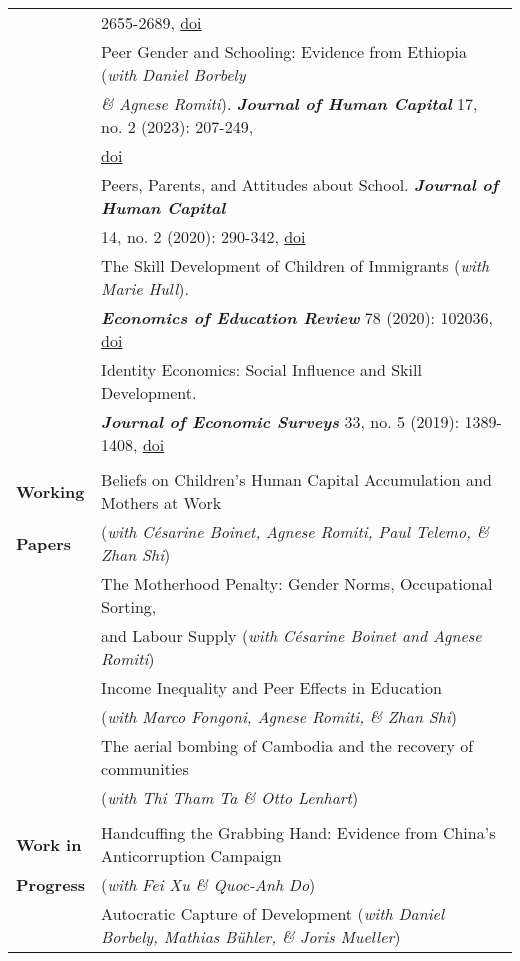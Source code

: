 \documentclass[11pt,a4paper]{article}
\begin{document}
\begin{longtable}{l l}
																				& 2655-2689, \href{https://doi.org/10.1007/s00148-023-00950-4}{doi}  \\
\addlinespace
																				&  Peer Gender and Schooling: Evidence from Ethiopia (\textit{with Daniel Borbely}    \\ 
																				&  \textit{\& Agnese Romiti}). \textbf{\textit{Journal of Human Capital}} 17, no. 2 (2023): 207-249, \\
																				& \href{https://doi.org/10.1086/723111}{doi}     \\ 
\addlinespace
																				&  Peers, Parents, and Attitudes about School. \textbf{\textit{Journal of Human Capital}}  \\
																				&  14, no. 2 (2020): 290-342, \href{https://doi.org/10.1086/709507}{doi}  \\   
\addlinespace						
																				&  The Skill Development of Children of Immigrants (\textit{with Marie Hull}).  \\ 
																				&  \textbf{\textit{Economics of Education Review}} 78 (2020): 102036, \href{https://doi.org/10.1016/j.econedurev.2020.102036}{doi}    \\			
\addlinespace
																				&  Identity Economics: Social Influence and Skill Development.     \\
																				&  \textbf{\textit{Journal of Economic Surveys}} 33, no. 5 (2019): 1389-1408, \href{ https://doi.org/10.1111/joes.12331}{doi}		\\			
																				&   \\
\textbf{Working} 							    			& Beliefs on Children's Human Capital Accumulation and Mothers at Work  \\
\textbf{Papers}													& (\textit{with C\'esarine Boinet, Agnese Romiti, Paul Telemo, \& Zhan Shi})  \\	
\addlinespace 
																				& The Motherhood Penalty: Gender Norms, Occupational Sorting,  \\
																				& and Labour Supply (\textit{with C\'esarine Boinet and Agnese Romiti})  \\ 
\addlinespace
																				&  Income Inequality and Peer Effects in Education  \\ 
																				&  (\textit{with Marco Fongoni, Agnese Romiti, \& Zhan Shi})   \\
\addlinespace
																				& The aerial bombing of Cambodia and the recovery of communities \\
																				& (\textit{with Thi Tham Ta \& Otto Lenhart})  \\											
																				&  \\
\textbf{Work in} 																& Handcuffing the Grabbing Hand: Evidence from China's Anticorruption Campaign \\ 			
\textbf{Progress}																& (\textit{with Fei Xu \& Quoc-Anh Do})  \\				
\addlinespace
																				&  Autocratic Capture of Development (\textit{with Daniel Borbely, Mathias B{\"u}hler, \& Joris Mueller})   \\								


\end{longtable}
\end{document}
